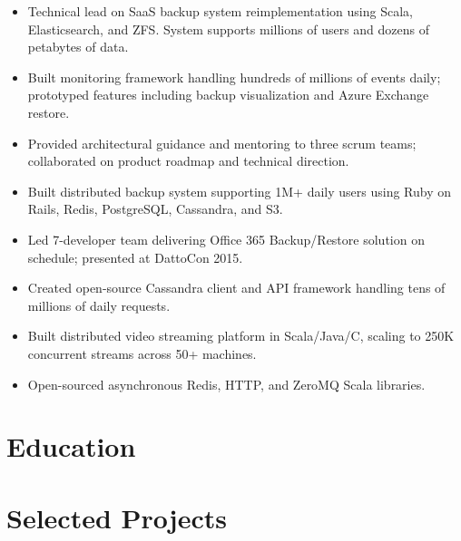 \documentclass[11pt,a4paper,sans]{moderncv}
\begin{document}
{ \begin{itemize} \itemsep -2pt
  \item Technical lead on SaaS backup system reimplementation using Scala, Elasticsearch, and ZFS. System supports millions of users and dozens of petabytes of data.
  \item Built monitoring framework handling hundreds of millions of events daily; prototyped features including backup visualization and Azure Exchange restore.
  \item Provided architectural guidance and mentoring to three scrum teams; collaborated on product roadmap and technical direction.
 \end{itemize} }

{ \begin{itemize} \itemsep -2pt
  \item Built distributed backup system supporting 1M+ daily users using Ruby on Rails, Redis, PostgreSQL, Cassandra, and S3.
  \item Led 7-developer team delivering Office 365 Backup/Restore solution on schedule; presented at DattoCon 2015.
  \item Created open-source Cassandra client and API framework handling tens of millions of daily requests.
\end{itemize} }

{ \begin{itemize} \itemsep -2pt
  \item Built distributed video streaming platform in Scala/Java/C, scaling to 250K concurrent streams across 50+ machines.
  \item Open-sourced asynchronous Redis, HTTP, and ZeroMQ Scala libraries.
\end{itemize} }


\section{\textbf{Education}}

\section{\textbf{Selected Projects}}
\end{document}
